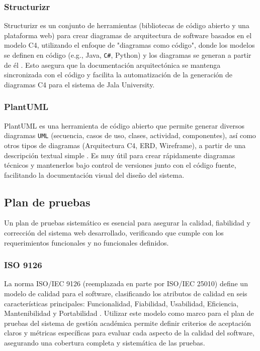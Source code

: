 \subsubsection{Structurizr}
Structurizr es un conjunto de herramientas (bibliotecas de código abierto y una plataforma web) para crear diagramas de arquitectura de software basados en el modelo C4, utilizando el enfoque de "diagramas como código", donde los modelos se definen en código (e.g., Java, \texttt{C\#}, Python) y los diagramas se generan a partir de él \parencite{BrownStructurizr}.
Esto asegura que la documentación arquitectónica se mantenga sincronizada con el código y facilita la automatización de la generación de diagramas C4 para el sistema de Jala University.

\subsubsection{PlantUML}
PlantUML es una herramienta de código abierto que permite generar diversos diagramas \texttt{UML} (secuencia, casos de uso, clases, actividad, componentes), así como otros tipos de diagramas (Arquitectura C4, ERD, Wireframe), a partir de una descripción textual simple \parencite{PlantUML}.
Es muy útil para crear rápidamente diagramas técnicos y mantenerlos bajo control de versiones junto con el código fuente, facilitando la documentación visual del diseño del sistema.

\subsection{Plan de pruebas}
Un plan de pruebas sistemático es esencial para asegurar la calidad, fiabilidad y corrección del sistema web desarrollado, verificando que cumple con los requerimientos funcionales y no funcionales definidos.

\subsubsection{ISO 9126}
La norma ISO/IEC 9126 (reemplazada en parte por ISO/IEC 25010) define un modelo de calidad para el software, clasificando los atributos de calidad en seis características principales: Funcionalidad, Fiabilidad, Usabilidad, Eficiencia, Mantenibilidad y Portabilidad \parencite{ISO9126}.
Utilizar este modelo como marco para el plan de pruebas del sistema de gestión académica permite definir criterios de aceptación claros y métricas específicas para evaluar cada aspecto de la calidad del software, asegurando una cobertura completa y sistemática de las pruebas.